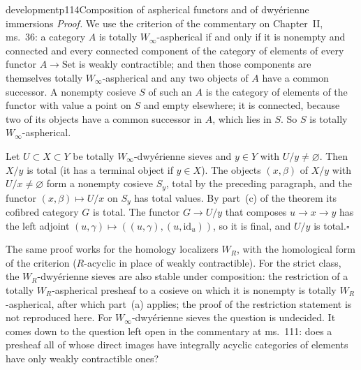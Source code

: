 \begin{dcomment}{development}{p114}{Composition of aspherical functors and of dwy\'erienne immersions}
\textit{Proof.}
We use the criterion of the commentary on Chapter~II, ms.~36: a category $A$ is totally $W_\infty$-aspherical if and only if it is nonempty and connected and every connected component of the category of elements of every functor $A\to\mathrm{Set}$ is weakly contractible; and then those components are themselves totally $W_\infty$-aspherical and any two objects of $A$ have a common successor. A nonempty cosieve $S$ of such an $A$ is the category of elements of the functor with value a point on $S$ and empty elsewhere; it is connected, because two of its objects have a common successor in $A$, which lies in $S$. So $S$ is totally $W_\infty$-aspherical.

Let $U\subset X\subset Y$ be totally $W_\infty$-dwy\'erienne sieves and $y\in Y$ with $U/y\neq\varnothing$. Then $X/y$ is total (it has a terminal object if $y\in X$). The objects $(x,\beta)$ of $X/y$ with $U/x\neq\varnothing$ form a nonempty cosieve $S_y$, total by the preceding paragraph, and the functor $(x,\beta)\mapsto U/x$ on $S_y$ has total values. By part~(c) of the theorem its cofibred category $G$ is total. The functor $G\to U/y$ that composes $u\to x\to y$ has the left adjoint $(u,\gamma)\mapsto((u,\gamma),(u,\mathrm{id}_u))$, so it is final, and $U/y$ is total.\hfill$\square$

The same proof works for the homology localizers $W_R$, with the homological form of the criterion ($R$-acyclic in place of weakly contractible). For the strict class, the $W_R$-dwy\'erienne sieves are also stable under composition: the restriction of a totally $W_R$-aspherical presheaf to a cosieve on which it is nonempty is totally $W_R$-aspherical, after which part~(a) applies; the proof of the restriction statement is not reproduced here. For $W_\infty$-dwy\'erienne sieves the question is undecided. It comes down to the question left open in the commentary at ms.~111: does a presheaf all of whose direct images have integrally acyclic categories of elements have only weakly contractible ones?
\end{dcomment}

